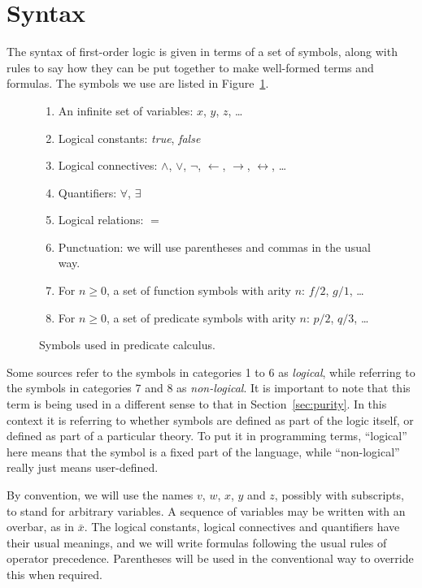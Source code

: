 \section{Syntax}
\label{sec:syntax}

The syntax of first-order logic is given in terms of a set of symbols,
along with rules to say how they can be put together
to make well-formed terms and formulas.
The symbols we use are listed in Figure~\ref{fig:symbols}.

\begin{figure}
\begin{enumerate}
\item
An infinite set of variables:
$x$, $y$, $z$, \ldots{}
\item
Logical constants:
\textit{true}, \textit{false}
\item
Logical connectives:
$\land$, $\lor$, $\lnot$, $\leftarrow$, $\rightarrow$,
$\leftrightarrow$, \ldots
\item
Quantifiers:
$\forall$, $\exists$
\item
Logical relations: $=$
\item
Punctuation: we will use parentheses and commas in the usual way.
\item
For $n \geqslant 0$,
a set of function symbols with arity $n$:
$f\!/2$, $g/1$, \ldots
\item
For $n \geqslant 0$,
a set of predicate symbols with arity $n$:
$p/2$, $q/3$, \ldots
\end{enumerate}
\caption{Symbols used in predicate calculus.\label{fig:symbols}}
\end{figure}

Some sources refer to the symbols in categories 1 to 6
as \emph{logical},
while referring to the symbols in categories 7 and 8 as
\emph{non-logical\label{gi:non-logical2}}.
It is important to note that
this term is being used in a different sense
to that in Section~\ref{sec:purity}.
In this context it is referring to whether symbols are
defined as part of the logic itself,
or defined as part of a particular theory.
To put it in programming terms,
``logical'' here means that
the symbol is a fixed part of the language,
while ``non-logical'' really just means user-defined.

By convention,
we will use the names $v$, $w$, $x$, $y$ and $z$,
possibly with subscripts,
to stand for arbitrary variables.
A sequence of variables may be written with an overbar,
as in $\bar{x}$.
The logical constants, logical connectives and quantifiers
have their usual meanings,
and we will write formulas following
the usual rules of operator precedence.
Parentheses will be used in the conventional way
to override this when required.

